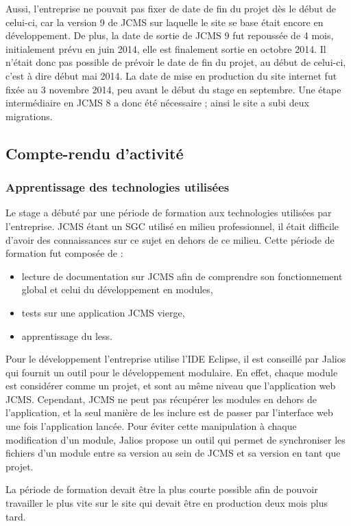 \documentclass[12pt,a4paper]{article}
\begin{document}
Aussi, l'entreprise ne pouvait pas fixer de date de fin du projet dès le début de celui-ci, car la version 9 de \gls{JCMS} sur laquelle le site se base était encore en développement. De plus, la date de sortie de \gls{JCMS} 9 fut repoussée de 4 mois, initialement prévu en juin 2014, elle est finalement sortie en octobre 2014. Il n'était donc pas possible de prévoir le date de fin du projet, au début de celui-ci, c'est à dire début mai 2014. La date de mise en production du site internet fut fixée au 3 novembre 2014, peu avant le début du stage en septembre. Une étape intermédiaire en \gls{JCMS} 8 a donc été nécessaire ; ainsi le site a subi deux migrations.\par
\subsection{Compte-rendu d'activité}
\subsubsection{Apprentissage des technologies utilisées}
Le stage a débuté par une période de formation aux technologies utilisées par l'entreprise. \gls{JCMS} étant un SGC utilisé en milieu professionnel, il était difficile d'avoir des connaissances sur ce sujet en dehors de ce milieu. Cette période de formation fut composée de :
\begin{itemize}
\item lecture de documentation sur \gls{JCMS} afin de comprendre son fonctionnement global et celui du développement en modules,
\item tests sur une application \gls{JCMS} vierge,
\item apprentissage du less.
\end{itemize}\par 
Pour le développement l'entreprise utilise l'IDE Eclipse, il est conseillé par Jalios qui fournit un outil pour le développement modulaire. En effet, chaque module est considérer comme un projet, et sont au même niveau que l'application web \gls{JCMS}. Cependant, \gls{JCMS} ne peut pas récupérer les modules en dehors de l'application, et la seul manière de les inclure est de passer par l'interface web une fois l'application lancée. Pour éviter cette manipulation à chaque modification d'un module, Jalios propose un outil qui permet de synchroniser les fichiers d'un module entre sa version au sein de \gls{JCMS} et sa version en tant que projet.\par
La période de formation devait être la plus courte possible afin de pouvoir travailler le plus vite sur le site qui devait être en production deux mois plus tard. \par
\end{document}

